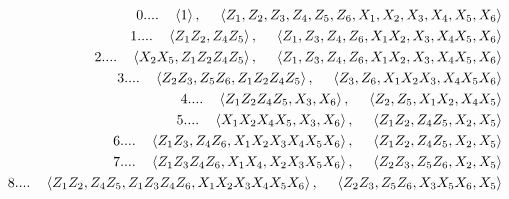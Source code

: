 \documentclass[a4paper,landscape,10pt]{ltjsarticle}
\begin{document}
\begin{align*}
    0....\ \ \ \ev{1},\ \ \ \ \ev{Z_1, Z_2, Z_3, Z_4, Z_5, Z_6, X_1, X_2, X_3, X_4, X_5, X_6}\\
    1....\ \ \ \ev{Z_1Z_2, Z_4Z_5},\ \ \ \ \ev{Z_1, Z_3, Z_4, Z_6, X_1X_2,  X_3, X_4X_5, X_6}\\
    2....\ \ \ \ev{X_2X_5, Z_1Z_2Z_4Z_5},\ \ \ \ \ev{Z_1, Z_3, Z_4, Z_6, X_1X_2, X_3, X_4X_5, X_6}\\
    3....\ \ \ \ev{Z_2Z_3, Z_5Z_6, Z_1Z_2Z_4Z_5},\ \ \ \ \ev{Z_3, Z_6, X_1X_2X_3, X_4X_5X_6}\\
    4....\ \ \ \ev{Z_1Z_2Z_4Z_5, X_3, X_6},\ \ \ \ \ev{Z_2, Z_5, X_1X_2, X_4X_5}\\
    5....\ \ \ \ev{X_1X_2X_4X_5, X_3, X_6},\ \ \ \ \ev{Z_1Z_2, Z_4Z_5, X_2, X_5}\\
    6....\ \ \ \ev{Z_1Z_3, Z_4Z_6, X_1X_2X_3X_4X_5X_6},\ \ \ \ \ev{Z_1Z_2, Z_4Z_5, X_2, X_5}\\
    7....\ \ \ \ev{Z_1Z_3Z_4Z_6, X_1X_4, X_2X_3X_5X_6},\ \ \ \ \ev{Z_2Z_3, Z_5Z_6, X_2, X_5}\\
    8....\ \ \ \ev{Z_1Z_2, Z_4Z_5, Z_1Z_3Z_4Z_6, X_1X_2X_3X_4X_5X_6},\ \ \ \ \ev{Z_2Z_3, Z_5Z_6, X_3X_5X_6, X_5}\\
\end{align*}
\end{document}
